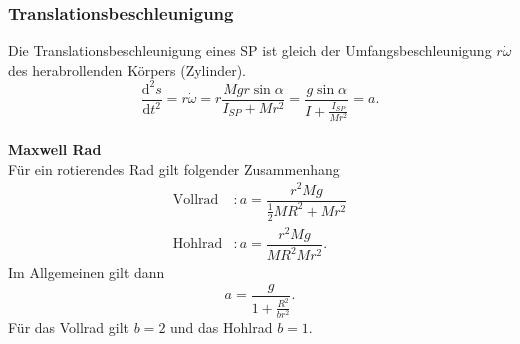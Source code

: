 \documentclass[a4paper,12pt]{article}
\numberwithin{equation}{section}
\begin{document}
\subsubsection{Translationsbeschleunigung}
Die Translationsbeschleunigung eines SP ist gleich der Umfangsbeschleunigung $r\dot{\omega }$ des herabrollenden Körpers (Zylinder).
\[ 
        \dfrac{\text{d}^2s}{\text{d}t^2}=r\dot{\omega }=r\dfrac{Mgr\sin \alpha }{I_{SP}+Mr^2}=\dfrac{g\sin \alpha }{I+\tfrac{I_{SP}}{Mr^2}}=a
.\] 
\hfill\\\textbf{Maxwell Rad}\\ 
Für ein rotierendes Rad gilt folgender Zusammenhang
\begin{align*}
        \text{Vollrad}&:a=\dfrac{r^2Mg}{\tfrac{1}{2}MR^2+Mr^2}\\
        \text{Hohlrad}&:a=\dfrac{r^2Mg}{MR^2Mr^2}
.\end{align*}
Im Allgemeinen gilt dann
\[ 
        a=\dfrac{g}{1+\tfrac{R^2}{br^2}}
.\] 
Für das Vollrad gilt $b=2$ und das Hohlrad $b=1$.
\end{document}
